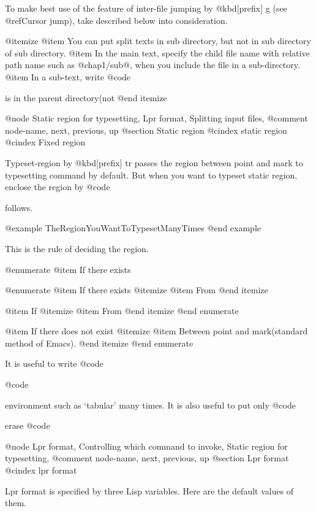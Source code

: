 {{{{{{{{  To make best use of the feature of inter-file jumping by
@kbd{[prefix] g} (see @ref{Cursor jump}), take described below into
consideration.

@itemize
@item You can put split texts in sub directory, but not in
 sub directory of sub directory.
@item In the main text, specify the child file name with relative path name
 such as @{chap1/sub@}, when you include the file in
 a sub-directory.
@item In a sub-text, write @code{%
 is in the parent directory(not %
@end itemize

@node Static region for typesetting, Lpr format, Splitting input files, %
@comment  node-name,  next,  previous,  up
@section Static region
@cindex static region
@cindex Fixed region

  Typeset-region by @kbd{[prefix] tr} passes the region between point and
mark to typesetting command by default.  But when you want to typeset
static region, enclose the region by @code{%
follows.

@example
          TheRegionYouWantToTypesetManyTimes
@end example

This is the rule of deciding the region.

@enumerate
@item
If there exists %

@enumerate
@item
If there exists %
@itemize
@item From %
@end itemize

@item
If %
@itemize
@item From %
@end itemize
@end enumerate

@item
If there does not exist %
@itemize
@item Between point and mark(standard method of Emacs).
@end itemize
@end enumerate

  It is useful to write @code{%
@code{%
environment such as `tabular' many times.  It is also useful to put only
@code{%
erase @code{%

@node Lpr format, Controlling which command to invoke, Static region for typesetting, %
@comment  node-name,  next,  previous,  up
@section Lpr format
@cindex lpr format

  Lpr format is specified by three Lisp variables.  Here are the
default values of them.

}}}}}}}}}}}}}}
